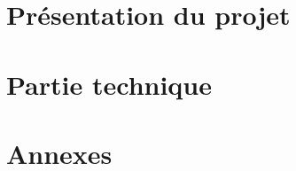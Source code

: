 \documentclass{article}
\begin{document}
	\tableofcontents

	\newpage

	\begin{figure}[p]
		\centering
		\part{Présentation du projet}
	\end{figure}
	
	

	

	\begin{figure}[p]
		\centering
		\part{Partie technique}
	\end{figure}

	\begin{figure}[p]
		\centering
		\part{Annexes}
	\end{figure}

	
\end{document}
